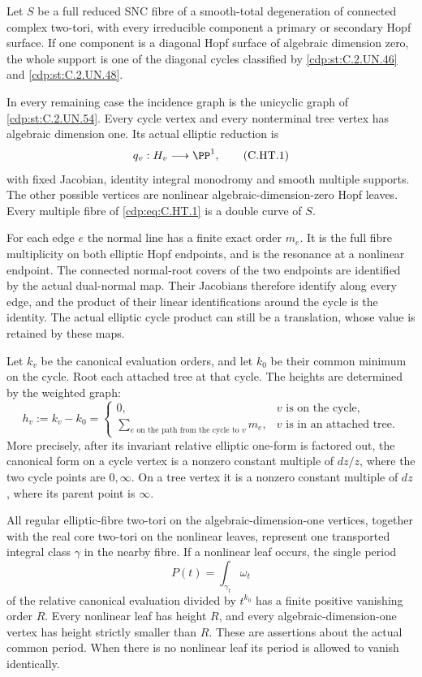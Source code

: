 
\begin{proposition}\label{cdp:st:C.2.UN.58}
Let $S$ be a full reduced SNC fibre of a smooth-total degeneration
of connected complex two-tori, with every irreducible component a
primary or secondary Hopf surface. If one component is a diagonal
Hopf surface of algebraic dimension zero, the whole support is
one of the diagonal cycles classified by \ref{cdp:st:C.2.UN.46} and \ref{cdp:st:C.2.UN.48}.

In every remaining case the incidence graph is the unicyclic graph
of \ref{cdp:st:C.2.UN.54}. Every cycle vertex and every nonterminal tree vertex
has algebraic dimension one. Its actual elliptic reduction is
\[
                    q_v:H_v\longrightarrow\PP^1,        \tag{C.HT.1}\label{cdp:eq:C.HT.1}
\]
with fixed Jacobian, identity integral monodromy and smooth multiple
supports. The other possible vertices are nonlinear
algebraic-dimension-zero Hopf leaves. Every multiple fibre of
\eqref{cdp:eq:C.HT.1} is a double curve of $S$.

For each edge $e$ the normal line has a finite exact order $m_e$.
It is the full fibre multiplicity on both elliptic Hopf endpoints,
and is the resonance at a nonlinear endpoint. The connected
normal-root covers of the two endpoints are identified by the
actual dual-normal map. Their Jacobians therefore identify along
every edge, and the product of their linear identifications around
the cycle is the identity. The actual elliptic cycle product can
still be a translation, whose value is retained by these maps.

Let $k_v$ be the canonical evaluation orders, and let $k_0$ be their
common minimum on the cycle. Root each attached tree at that cycle.
The heights are determined by the weighted graph:
\[
 h_v:=k_v-k_0=
 \begin{cases}
 0,&v\text{ is on the cycle},\\
 \displaystyle\sum_{e\text{ on the path from the cycle to }v}m_e,
       &v\text{ is in an attached tree}.
 \end{cases}                                           \tag{C.HT.2}\label{cdp:eq:C.HT.2}
\]
More precisely, after its invariant relative elliptic one-form is
factored out, the canonical form on a cycle vertex is a nonzero
constant multiple of $dz/z$, where the two cycle points are
$0,\infty$. On a tree vertex it is a nonzero constant multiple of
$dz$, where its parent point is $\infty$.

All regular elliptic-fibre two-tori on the algebraic-dimension-one
vertices, together with the real core two-tori on the nonlinear
leaves, represent one transported integral class $\gamma$ in the
nearby fibre. If a nonlinear leaf occurs, the single period
\[
                     P(t)=\int_{\gamma_t}\omega_t       \tag{C.HT.3}\label{cdp:eq:C.HT.3}
\]
of the relative canonical evaluation divided by $t^{k_0}$ has a
finite positive vanishing order $R$. Every nonlinear leaf has
height $R$, and every algebraic-dimension-one vertex has height
strictly smaller than $R$. These are assertions about the actual
common period. When there is no nonlinear leaf its period is
allowed to vanish identically.
\end{proposition}

